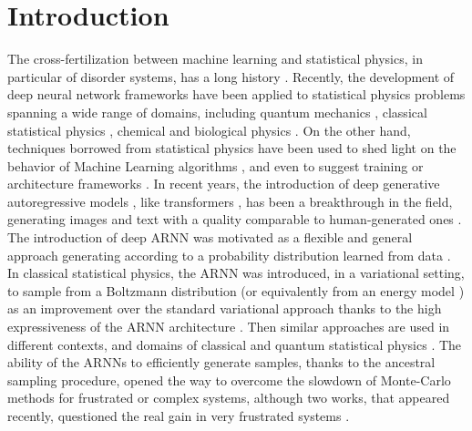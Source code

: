 \documentclass[aps,physrev,10pt,floatfix,reprint]{revtex4-2}
\begin{document}
\section{Introduction} 
The cross-fertilization between machine learning and statistical physics, in particular of disorder systems, has a long history \cite{doi:10.1073/pnas.79.8.2554, PhysRevA.32.1007}.
Recently, the development of deep neural network frameworks \cite{bengioNatureDeepLearning2015} have been applied to statistical physics problems \cite{RevModPhys.91.045002} spanning a wide range of domains, including quantum mechanics \cite{doi:10.1126/science.aag2302, Nieuwenburg2017}, 
classical statistical physics \cite{Carrasquilla2017, Wu2019}, chemical and biological physics \cite{noe2019boltzmann,jumper2021highly}.
On the other hand, techniques borrowed from statistical physics have been used to shed light on the behavior of Machine Learning algorithms \cite{doi:10.1080/00018732.2016.1211393, Nguyen2017}, and even to suggest training or architecture frameworks \cite{Chaudhari_2019, pmlr-v37-sohl-dickstein15}.
In recent years, the introduction of deep generative autoregressive models \cite{pmlr-v37-germain15, NIPS2016_b1301141}, like transformers \cite{NIPS2017_3f5ee243}, has been a breakthrough in the field, generating images and text with a quality comparable to human-generated ones \cite{https://doi.org/10.48550/arxiv.2005.14165}.  
The introduction of deep ARNN was motivated as a flexible and general approach generating according to a probability distribution learned from data \cite{pmlr-v32-gregor14, pmlr-v15-larochelle11a, pmlr-v48-oord16}. In classical statistical physics, the ARNN was introduced, in a variational setting, to sample from a Boltzmann distribution (or equivalently from an energy model \cite{pmlr-v80-huang18d}) as an improvement over the standard variational approach thanks to the high expressiveness of the ARNN architecture \cite{Wu2019}. Then similar approaches are used in different contexts, and domains of classical \cite{10.1103/physreve.101.023304,PhysRevE.101.053312,PhysRevE.103.012103,PhysRevResearch.3.L042024,10.1038/s42256-021-00401-3} and quantum statistical physics \cite{10.1103/physrevlett.128.090501,PhysRevA.102.062413,PhysRevLett.124.020503,PhysRevResearch.2.023358, Liu_2021, Barrett2022}. The ability of the ARNNs to efficiently generate samples, thanks to the ancestral sampling procedure, opened the way to overcome the slowdown of Monte-Carlo methods for frustrated or complex systems, although two works, that appeared recently, questioned the real gain in very frustrated systems \cite{condmat7020038,https://doi.org/10.48550/arxiv.2210.11145}.
\end{document}
